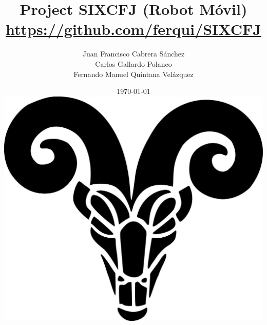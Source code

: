 \documentclass[a4paper,11pt,spanish]{report}
\title{Project SIXCFJ (Robot Móvil)\\\url{https://github.com/ferqui/SIXCFJ}}
\author{Juan Francisco Cabrera Sánchez\\ Carlos Gallardo Polanco\\ Fernando Manuel Quintana Velázquez}
\date{\today\\ \vspace{25pt} \includegraphics[scale=0.25]{logo.jpg}}
\begin{document}
\maketitle

\doublespacing
\tableofcontents
\singlespacing
\listoffigures

\listoftables






















\end{document}
